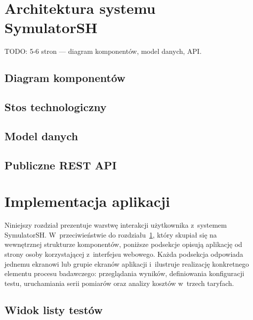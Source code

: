\documentclass[12pt,twoside]{article}
\begin{document}
\section{Architektura systemu SymulatorSH}
\label{sec:architektura}

TODO: 5-6 stron — diagram komponentów, model danych, API.

\subsection{Diagram komponentów}
\subsection{Stos technologiczny}
\subsection{Model danych}
\subsection{Publiczne REST API}


\section{Implementacja aplikacji}
\label{sec:implementacja}

Niniejszy rozdział prezentuje warstwę interakcji użytkownika z~systemem SymulatorSH. W~przeciwieństwie do rozdziału~\ref{sec:architektura}, który skupiał się na wewnętrznej strukturze komponentów, poniższe podsekcje opisują aplikację od strony osoby korzystającej z~interfejsu webowego. Każda podsekcja odpowiada jednemu ekranowi lub grupie ekranów aplikacji i~ilustruje realizację konkretnego elementu procesu badawczego: przeglądania wyników, definiowania konfiguracji testu, uruchamiania serii pomiarów oraz analizy kosztów w~trzech taryfach.

\subsection{Widok listy testów}
\label{sec:impl:lista}
\end{document}
